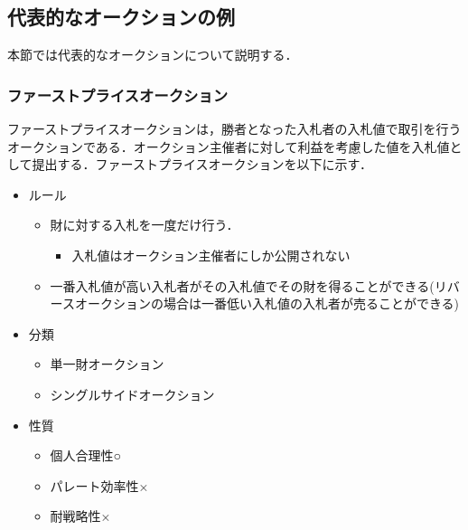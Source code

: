 \hypertarget{ux4ee3ux8868ux7684ux306aux30aaux30fcux30afux30b7ux30e7ux30f3ux306eux4f8b}{%
\subsection{代表的なオークションの例}\label{ux4ee3ux8868ux7684ux306aux30aaux30fcux30afux30b7ux30e7ux30f3ux306eux4f8b}}

本節では代表的なオークションについて説明する．

\hypertarget{ux30d5ux30a1ux30fcux30b9ux30c8ux30d7ux30e9ux30a4ux30b9ux30aaux30fcux30afux30b7ux30e7ux30f3}{%
\subsubsection{ファーストプライスオークション}\label{ux30d5ux30a1ux30fcux30b9ux30c8ux30d7ux30e9ux30a4ux30b9ux30aaux30fcux30afux30b7ux30e7ux30f3}}

ファーストプライスオークションは，勝者となった入札者の入札値で取引を行うオークションである．オークション主催者に対して利益を考慮した値を入札値として提出する．ファーストプライスオークションを以下に示す．

\begin{itemize}
\tightlist
\item
  ルール

  \begin{itemize}
  \tightlist
  \item
    財に対する入札を一度だけ行う．

    \begin{itemize}
    \tightlist
    \item
      入札値はオークション主催者にしか公開されない
    \end{itemize}
  \item
    一番入札値が高い入札者がその入札値でその財を得ることができる(リバースオークションの場合は一番低い入札値の入札者が売ることができる)
  \end{itemize}
\item
  分類

  \begin{itemize}
  \tightlist
  \item
    単一財オークション
  \item
    シングルサイドオークション
  \end{itemize}
\item
  性質

  \begin{itemize}
  \tightlist
  \item
    個人合理性○
  \item
    パレート効率性×
  \item
    耐戦略性×
  \end{itemize}
\end{itemize}

